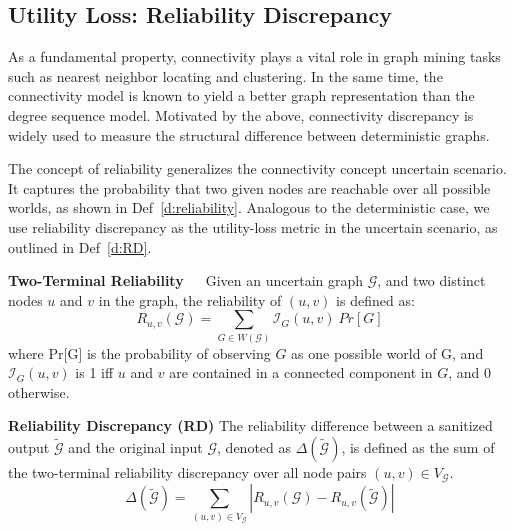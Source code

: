\subsection{Utility Loss: Reliability Discrepancy}

As a fundamental property, connectivity plays a vital role in graph mining tasks such as nearest neighbor locating and clustering. 
In the same time, the connectivity model is known to yield a better graph representation than the degree sequence model. 
Motivated by the above, connectivity discrepancy is widely used to measure the structural difference between deterministic graphs. 

The concept of reliability generalizes the connectivity concept uncertain scenario. 
It captures the probability that two given nodes are reachable over all possible worlds, as shown in Def~\ref{d:reliability}. 
Analogous to the deterministic case, we use reliability discrepancy as the utility-loss metric in the uncertain scenario, as outlined in Def~\ref{d:RD}. 
\begin{definition}
    \textbf{Two-Terminal Reliability~\cite{Colbourn_Colbourn_1987}}~~Given an uncertain graph $\mathcal{G}$, and two distinct nodes $u$ and $v$ in the graph, the reliability of $(u,v)$ is defined as:
        \begin{equation*}
                R_{u,v}(\mathcal{G})= \sum_{G \in W(\mathcal{G})} \mathcal{I}_{G}(u,v) ~ Pr[G] 
        \end{equation*}
    where Pr[G] is the probability of observing $G$ as one possible world of G, and $\mathcal{I}_{G}(u,v)$ is 1 iff $u$ and $v$ are contained in a connected component in $G$, and 0 otherwise.   
    \label{d:reliability}
\end{definition}

\theoremstyle{definition}
\begin{definition}
    \textbf{Reliability Discrepancy (RD)}
    The reliability difference between a sanitized output $\tilde{\mathcal{G}}$ and the original input $\mathcal{G}$, 
    denoted as $\Delta(\tilde{\mathcal{G}})$, 
    is defined as the sum of the two-terminal reliability discrepancy over all node pairs $(u,v) \in V_\mathcal{G}$.
    \begin{equation*}
        \Delta(\tilde{\mathcal{G}})=\sum_{(u,v) \in V_\mathcal{G} }|R_{u,v}(\mathcal{G})-R_{u,v}(\tilde{\mathcal{G}})|
    \end{equation*}
    \label{d:RD}
\end{definition}

